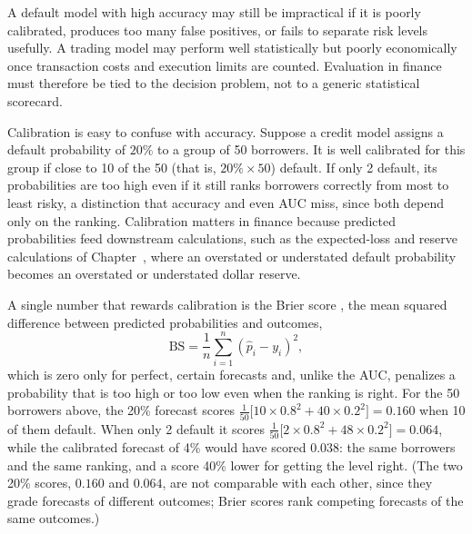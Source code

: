 \documentclass[../ai_in_finance]{subfiles}
\begin{document}
A default model with high accuracy may still be impractical if it is poorly calibrated, produces too many false positives, or fails to separate risk levels usefully. A trading model may perform well statistically but poorly economically once transaction costs and execution limits are counted. Evaluation in finance must therefore be tied to the decision problem, not to a generic statistical scorecard.

Calibration is easy to confuse with accuracy. Suppose a credit model assigns a default probability of $20\%$ to a group of 50 borrowers. It is well calibrated for this group if close to 10 of the 50 (that is, $20\% \times 50$) default. If only 2 default, its probabilities are too high even if it still ranks borrowers correctly from most to least risky, a distinction that accuracy and even AUC miss, since both depend only on the ranking. Calibration matters in finance because predicted probabilities feed downstream calculations, such as the expected-loss and reserve calculations of Chapter~, where an overstated or understated default probability becomes an overstated or understated dollar reserve.


A single number that rewards calibration is the Brier score \parencite{brier1950verification}, the mean squared difference between predicted probabilities and outcomes,
\begin{equation*}
\text{BS} = \frac{1}{n}\sum_{i=1}^n (\hat p_i - y_i)^2,
\end{equation*}
which is zero only for perfect, certain forecasts and, unlike the AUC, penalizes a probability that is too high or too low even when the ranking is right. For the 50 borrowers above, the 20\% forecast scores $\tfrac{1}{50}\big[10 \times 0.8^2 + 40 \times 0.2^2\big] = 0.160$ when 10 of them default. When only 2 default it scores $\tfrac{1}{50}\big[2 \times 0.8^2 + 48 \times 0.2^2\big] = 0.064$, while the calibrated forecast of 4\% would have scored $0.038$: the same borrowers and the same ranking, and a score 40\% lower for getting the level right. (The two 20\% scores, $0.160$ and $0.064$, are not comparable with each other, since they grade forecasts of different outcomes; Brier scores rank competing forecasts of the same outcomes.)
\end{document}
